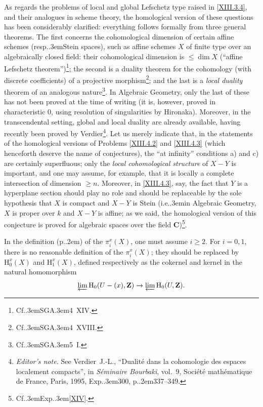 \documentclass[11pt,a4paper,oneside]{book}
\providecommand{\sisi}[2]{#2}
\providecommand{\pageoriginale}{%
  \refstepcounter{pageoriginal}%
  \marginpar{\raggedright\footnotesize\bfseries\thepageoriginal}%
  \xspace}
\providecommand{\nde}[1]{\footnote{\textit{Editor's note.} #1}}
\providecommand{\sfootnote}[1]{\footnote{#1}}
\providecommand{\og}{``}
\providecommand{\fg}{''\xspace}
\providecommand{\Cf}{Cf.\kern.3em}
\providecommand{\ie}{i.e.\kern.3em}
\providecommand{\resp}{resp.\kern.3em}
\providecommand{\SGA}{\textup{SGA}\kern.3em}
\providecommand{\Exp}{Exp.\kern.3em}
\providecommand{\ptbl}{.\kern.2em}
\providecommand{\CC}{\mathbf C}
\providecommand{\ZZ}{\mathbf Z}
\renewcommand{\H}{\mathrm H}
\theoremstyle{plain}
\theoremstyle{definition}
\theoremstyle{remark}
\renewcommand{\Ref}[1]{\textup{\ref{#1}}}
\begin{document}
As regards the problems of local and global Lefschetz type raised in \Ref{XIII.3.4}, and their analogues in scheme theory, the homological version of these questions has been considerably clarified: everything follows formally from three general theorems. The first concerns the cohomological dimension of\pageoriginale certain affine schemes (\resp Stein spaces), such as affine schemes $X$ of finite type over an algebraically closed field: their cohomological dimension is $\leq\dim X$ (\og affine Lefschetz theorem\fg)\sfootnote{\Cf \SGA 4~XIV.}; the second is a duality theorem for the cohomology (with discrete coefficients) of a projective morphism\sfootnote{\Cf \SGA 4~XVIII.}; and the last is a \emph{local duality} theorem of an analogous nature\sfootnote{\Cf \SGA 5~I.}. In Algebraic Geometry, only the last of these has not been proved at the time of writing (it is, however, proved in \sisi{char.~$0$}{characteristic $0$}, using resolution of singularities by \sisi{HIRONAKA}{Hironaka}). Moreover, in the transcendental setting, global and local duality are already available, having recently been proved by \sisi{VERDIER}{Verdier}\nde{See Verdier~J.-L., {\og Dualit\'e dans la cohomologie des espaces localement compacts\fg}, in \emph{S\'eminaire Bourbaki}, vol.~9, Soci\'et\'e math\'ematique de France, Paris, 1995, \Exp 300, p\ptbl 337--349.}. Let us merely indicate that, in the statements of the homological versions of Problems \Ref{XIII.4.2} and \Ref{XIII.4.3} (which henceforth deserve the name of conjectures), the \og at infinity\fg conditions a) and c) are certainly superfluous; only the \emph{local cohomological structure} of $X-Y$ is important, and one may assume, for example, that it is locally a complete intersection of dimension $\geq n$. Moreover, in \Ref{XIII.4.3}, say, the fact that $Y$ is a hyperplane section should play no role and should be replaceable by the sole hypothesis that $X$ is compact and $X-Y$ is Stein (\ie in Algebraic Geometry, $X$ is proper over $k$ and $X-Y$ is affine; as we said, the homological version of this conjecture is proved for algebraic spaces over the field $\CC$)\sfootnote{\Cf \Exp \Ref{XIV}.}.

\label{p25y}%
In the definition (p\ptbl\sisi{15}{\pageref{pip15}}) of the $\pi_i^x(X)$, one must assume $i\geq 2$. For $i=0,1$, there is no reasonable definition of the $\pi_i^x(X)$\sisi{,}{;} they should be replaced by $\H_0^x(X)$ and $\H_1^x(X)$, defined respectively as the co\sisi{-}{}kernel and kernel in the natural homomorphism
$$
\varprojlim \H_0(U-(x),\ZZ)\to\varprojlim\H_0(U,\ZZ).
$$
\end{document}
